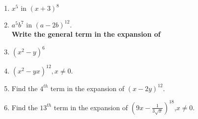 \begin{enumerate}[label=\arabic*.,ref=\thesubsection.\theenumi]
\item $x^5$ in $(x+3)^8$\\
\item $a^5b^7$ in $(a - 2b)^{12}.$\\

\textbf {Write the general term in the expansion of}\\
\item $(x^2 - y)^6$\\
\item $(x^2 - yx)^{12}, x \neq 0.$\\
\item Find the $4^{th}$ term in the expansion of $(x - 2y)^{12}.$\\
\item Find the $13^{th}$ term in the expansion of $ (9x - \frac{1}{3\sqrt{x}})^{18}$,$ x \neq 0.$\\


\end{enumerate}
